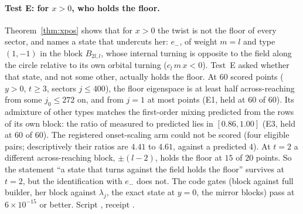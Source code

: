 \documentclass[11pt]{article}
\theoremstyle{definition}
\theoremstyle{remark}
\begin{document}
\paragraph{Test E: for $x>0$, who holds the floor.} Theorem~\ref{thm:xpos} shows that for $x>0$ the twist is not the
floor of every sector, and names a state that undercuts her: $e_-$, of weight $m=l$ and type $(1,-1)$ in the block
$B_{2l,l}$, whose internal turning is opposite to the field along the circle relative to its own orbital turning
($c_l\,m\,x<0$). Test~E asked whether that state, and not some other, actually holds the floor. At $60$ scored points
($y>0$, $t\ge3$, sectors $j\le400$), the floor eigenspace is at least half across-reaching from some $j_0\le272$ on,
and from $j=1$ at most points (E1, held at $60$ of $60$). Its admixture of other types matches the first-order mixing
predicted from the rows of its own block: the ratio of measured to predicted lies in $[0.86,1.00]$ (E3, held at $60$ of
$60$). The registered onset-scaling arm could not be scored (four eligible pairs; descriptively their ratios are
$4.41$ to $4.61$, against a predicted $4$). At $t=2$ a different across-reaching block, $\pm(l-2)$, holds the floor at
$15$ of $20$ points. So the statement ``a state that turns against the field holds the floor'' survives at $t=2$, but
the identification with $e_-$ does not. The code gates (block against full builder, her block against $\lambda_j$, the
exact state at $y=0$, the mirror blocks) pass at $6\times10^{-15}$ or better. Script ,
receipt .
\end{document}
